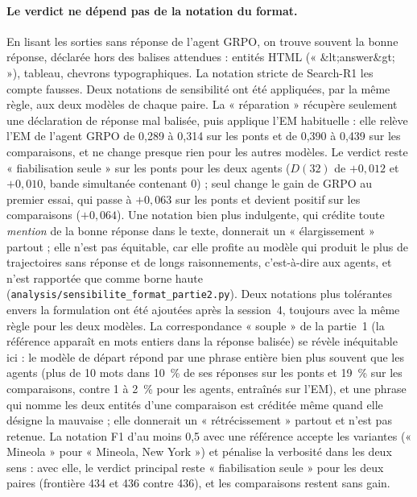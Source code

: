 \documentclass[11pt,a4paper]{article}
\begin{document}
\paragraph{Le verdict ne dépend pas de la notation du format.} En lisant les sorties sans réponse de l'agent GRPO, on trouve souvent la bonne réponse, déclarée hors des balises attendues : entités HTML (« \&lt;answer\&gt; »), tableau, chevrons typographiques. La notation stricte de Search-R1 les compte fausses. Deux notations de sensibilité ont été appliquées, par la même règle, aux deux modèles de chaque paire. La « réparation » récupère seulement une déclaration de réponse mal balisée, puis applique l'EM habituelle : elle relève l'EM de l'agent GRPO de 0,289 à 0,314 sur les ponts et de 0,390 à 0,439 sur les comparaisons, et ne change presque rien pour les autres modèles. Le verdict reste « fiabilisation seule » sur les ponts pour les deux agents ($D(32)$ de $+0{,}012$ et $+0{,}010$, bande simultanée contenant 0) ; seul change le gain de GRPO au premier essai, qui passe à $+0{,}063$ sur les ponts et devient positif sur les comparaisons ($+0{,}064$). Une notation bien plus indulgente, qui crédite toute \emph{mention} de la bonne réponse dans le texte, donnerait un « élargissement » partout ; elle n'est pas équitable, car elle profite au modèle qui produit le plus de trajectoires sans réponse et de longs raisonnements, c'est-à-dire aux agents, et n'est rapportée que comme borne haute (\texttt{analysis/sensibilite\_format\_partie2.py}). Deux notations plus tolérantes envers la formulation ont été ajoutées après la session~4, toujours avec la même règle pour les deux modèles. La correspondance « souple » de la partie~1 (la référence apparaît en mots entiers dans la réponse balisée) se révèle inéquitable ici : le modèle de départ répond par une phrase entière bien plus souvent que les agents (plus de 10 mots dans 10~\% de ses réponses sur les ponts et 19~\% sur les comparaisons, contre 1 à 2~\% pour les agents, entraînés sur l'EM), et une phrase qui nomme les deux entités d'une comparaison est créditée même quand elle désigne la mauvaise ; elle donnerait un « rétrécissement » partout et n'est pas retenue. La notation F1 d'au moins 0,5 avec une référence accepte les variantes (« Mineola » pour « Mineola, New York ») et pénalise la verbosité dans les deux sens : avec elle, le verdict principal reste « fiabilisation seule » pour les deux paires (frontière 434 et 436 contre 436), et les comparaisons restent sans gain.
\end{document}
